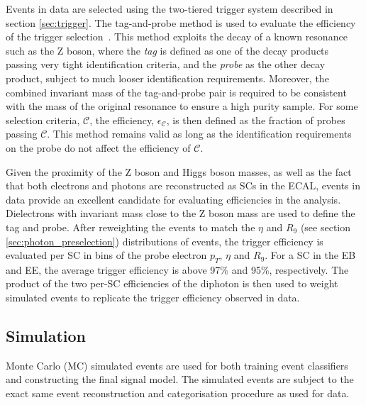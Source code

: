 Events in data are selected using the two-tiered trigger system described in section \ref{sec:trigger}. The tag-and-probe method is used to evaluate the efficiency of the trigger selection~\cite{CMS:2011aa}. This method exploits the decay of a known resonance such as the Z boson, where the \textit{tag} is defined as one of the decay products passing very tight identification criteria, and the \textit{probe} as the other decay product, subject to much looser identification requirements. Moreover, the combined invariant mass of the tag-and-probe pair is required to be consistent with the mass of the original resonance to ensure a high purity sample. For some selection criteria, $\mathcal{C}$, the efficiency, $\epsilon_{\mathcal{C}}$, is then defined as the fraction of probes passing $\mathcal{C}$. This method remains valid as long as the identification requirements on the probe do not affect the efficiency of $\mathcal{C}$.

Given the proximity of the Z boson and Higgs boson masses, as well as the fact that both electrons and photons are reconstructed as SCs in the ECAL, \Zee events in data provide an excellent candidate for evaluating efficiencies in the \Hgg analysis. Dielectrons with invariant mass close to the Z boson mass are used to define the tag and probe. After reweighting the \Zee events to match the $\eta$ and $R_9$ (see section \ref{sec:photon_preselection}) distributions of \Hgg events, the trigger efficiency is evaluated per SC in bins of the probe electron $p_T$, $\eta$ and $R_9$. For a SC in the EB and EE, the average trigger efficiency is above 97\% and 95\%, respectively. The product of the two per-SC efficiencies of the diphoton is then used to weight simulated events to replicate the trigger efficiency observed in data. 

\subsection{Simulation}\label{sec:hgg_simulation}
Monte Carlo (MC) simulated events are used for both training event classifiers and constructing the final signal model. The simulated events are subject to the exact same event reconstruction and categorisation procedure as used for data. 

